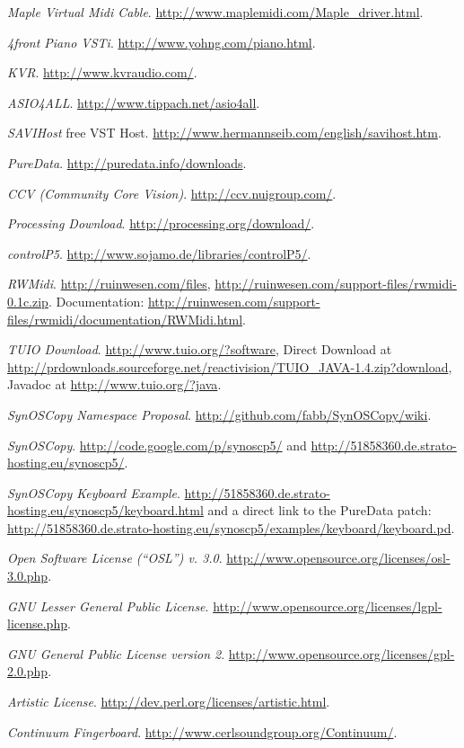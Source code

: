 \documentclass[12pt,a4paper,titlepage,oneside]{report}
\begin{document}
\begin{thebibliography}{99}
  \emph{Maple Virtual Midi Cable}.
  \url{http://www.maplemidi.com/Maple_driver.html}.
  
  \emph{4front Piano VSTi}.
  \url{http://www.yohng.com/piano.html}.
  
  \emph{KVR}.
  \url{http://www.kvraudio.com/}.
  
  \emph{ASIO4ALL}.
  \url{http://www.tippach.net/asio4all}.
  
  \emph{SAVIHost} free VST Host.
  \url{http://www.hermannseib.com/english/savihost.htm}.
  
  \emph{PureData}.
  \url{http://puredata.info/downloads}.
  
  \emph{CCV (Community Core Vision)}.
  \url{http://ccv.nuigroup.com/}.

  \emph{Processing Download}.
  \url{http://processing.org/download/}.

  \emph{controlP5}.
  \url{http://www.sojamo.de/libraries/controlP5/}.

  \emph{RWMidi}.
  \url{http://ruinwesen.com/files}, \url{http://ruinwesen.com/support-files/rwmidi-0.1c.zip}.
  Documentation: \url{http://ruinwesen.com/support-files/rwmidi/documentation/RWMidi.html}.

  \emph{TUIO Download}.
  \url{http://www.tuio.org/?software}, Direct Download at \url{http://prdownloads.sourceforge.net/reactivision/TUIO_JAVA-1.4.zip?download}, Javadoc at \url{http://www.tuio.org/?java}.
  
  \emph{SynOSCopy Namespace Proposal}.
  \url{http://github.com/fabb/SynOSCopy/wiki}.

  \emph{SynOSCopy}.
  \url{http://code.google.com/p/synoscp5/} and \url{http://51858360.de.strato-hosting.eu/synoscp5/}.
  
  \emph{SynOSCopy Keyboard Example}.
  \url{http://51858360.de.strato-hosting.eu/synoscp5/keyboard.html} and a direct link to the PureData patch: \url{http://51858360.de.strato-hosting.eu/synoscp5/examples/keyboard/keyboard.pd}.
  
  \emph{Open Software License (``OSL'') v. 3.0}.
  \url{http://www.opensource.org/licenses/osl-3.0.php}.

  \emph{GNU Lesser General Public License}.
  \url{http://www.opensource.org/licenses/lgpl-license.php}.

  \emph{GNU General Public License version 2}.
  \url{http://www.opensource.org/licenses/gpl-2.0.php}.
  
  \emph{Artistic License}.
  \url{http://dev.perl.org/licenses/artistic.html}.

  \emph{Continuum Fingerboard}.
  \url{http://www.cerlsoundgroup.org/Continuum/}.

\end{thebibliography}
\end{document}
